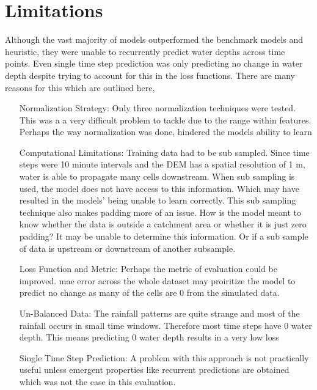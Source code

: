 \section{Limitations}
Although the vast majority of models outperformed the benchmark models and heuristic, they were unable to recurrently predict water depths across time points. Even single time step prediction was only predicting no change in water depth despite trying to account for this in the loss functions. There are many reasons for this which are outlined here,
\begin{enumerate}[align=left]
	\item[Normalization Strategy: ]  Only three normalization techniques were tested. This was a a very difficult problem to tackle due to the range within features. Perhaps the way normalization was done, hindered the models ability to learn
	\item[Computational Limitations: ] Training data had to be sub sampled. Since time steps were 10 minute intervals and the DEM has a spatial resolution of 1 m, water is able to propagate many cells downstream. When sub sampling is used, the model does not have access to this information. Which may have resulted in the models' being unable to learn correctly. This sub sampling technique also makes padding more of an issue. How is the model meant to know whether the data is outside a catchment area or whether it is just zero padding? It may be unable to determine this information. Or if a sub sample of data is upstream or downstream of another subsample.
	\item[Loss Function and Metric: ] Perhaps the metric of evaluation could be improved. mae error across the whole dataset may proiritize the model to predict no change as many of the cells are 0 from the simulated data. 
	\item[Un-Balanced Data: ] The rainfall patterns are quite strange and most of the rainfall occurs in small time windows. Therefore most time steps have 0 water depth. This means predicting 0 water depth results in a very low loss
	\item[Single Time Step Prediction: ] A problem with this approach is not practically useful unless emergent properties like recurrent predictions are obtained which was not the case in this evaluation.
\end{enumerate}



